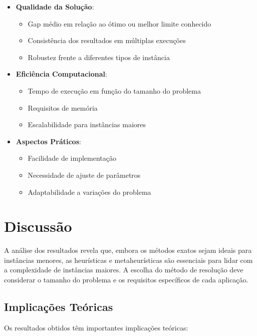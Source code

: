 \documentclass[12pt, a4paper]{report}
\begin{document}
\begin{itemize}
    \item \textbf{Qualidade da Solução}:
    \begin{itemize}
        \item Gap médio em relação ao ótimo ou melhor limite conhecido
        \item Consistência dos resultados em múltiplas execuções
        \item Robustez frente a diferentes tipos de instância
    \end{itemize}
    
    \item \textbf{Eficiência Computacional}:
    \begin{itemize}
        \item Tempo de execução em função do tamanho do problema
        \item Requisitos de memória
        \item Escalabilidade para instâncias maiores
    \end{itemize}
    
    \item \textbf{Aspectos Práticos}:
    \begin{itemize}
        \item Facilidade de implementação
        \item Necessidade de ajuste de parâmetros
        \item Adaptabilidade a variações do problema
    \end{itemize}
\end{itemize}

\section{Discussão}
A análise dos resultados revela que, embora os métodos exatos sejam ideais para instâncias menores, as heurísticas e metaheurísticas são essenciais para lidar com a complexidade de instâncias maiores. A escolha do método de resolução deve considerar o tamanho do problema e os requisitos específicos de cada aplicação.

\subsection{Implicações Teóricas}
Os resultados obtidos têm importantes implicações teóricas:
\end{document}
